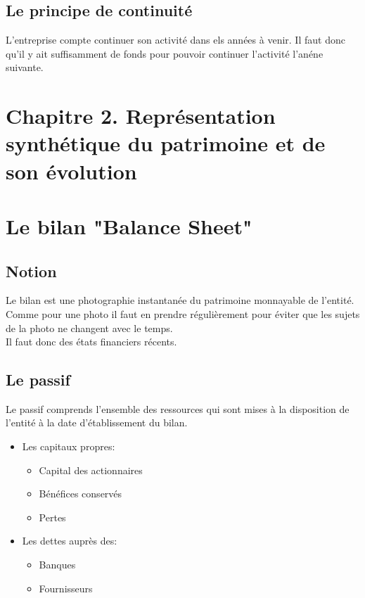\documentclass{article}
\begin{document}
\subsection{Le principe de continuité}
L'entreprise compte continuer son activité dans els années à venir. Il faut donc qu'il y ait suffisamment de fonds pour pouvoir continuer l'activité l'anéne suivante. \\


\section*{Chapitre 2. Représentation synthétique du patrimoine et de son évolution}
\section{Le bilan "Balance Sheet"}
\subsection{Notion}
Le bilan est une photographie instantanée du patrimoine monnayable de l'entité. Comme pour une photo il faut en prendre régulièrement pour éviter que les sujets de la photo ne changent avec le temps. \\
Il faut donc des états financiers récents.

\subsection{Le passif}
Le passif comprends l'ensemble des ressources qui sont mises à la disposition de l'entité à la date d'établissement du bilan. 
\begin{itemize}
    \item Les capitaux propres:
    \begin{itemize}
        \item Capital des actionnaires
        \item Bénéfices conservés
        \item Pertes
    \end{itemize}
    \item Les dettes auprès des:
    \begin{itemize}
        \item Banques
        \item Fournisseurs
    \end{itemize}
\end{itemize}
\end{document}
